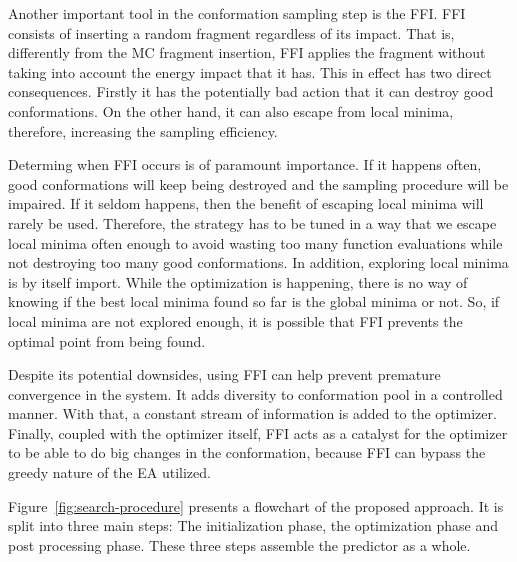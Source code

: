 Another important tool in the conformation sampling step is the \ac{FFI}.
\ac{FFI} consists of inserting a random fragment regardless of its impact. That is,
differently from the \ac{MC} fragment insertion, \ac{FFI} applies the fragment
without taking into account the energy impact that it has. This in effect has
two direct consequences. Firstly it has the potentially bad action that it can
destroy good conformations. On the other hand, it can also escape from local
minima, therefore, increasing the sampling efficiency.

Determing when \ac{FFI}
occurs is of paramount importance. If it happens often, good conformations will
keep being destroyed and the sampling procedure will be impaired. If it seldom 
happens, then the benefit of escaping local minima will rarely be used. Therefore,
the strategy has to be tuned in a way that we escape local minima often enough
to avoid wasting too many function evaluations while not destroying too many
good conformations. In addition, exploring local minima is by itself import.
While the optimization is happening, there is no way of knowing if the best local
minima found so far is the global minima or not. So, if local minima are not
explored enough, it is possible that \ac{FFI} prevents the optimal point from
being found.

Despite its potential downsides, using \ac{FFI} can help prevent premature
convergence in the system. It adds diversity to conformation pool in a controlled
manner. With that, a constant stream of information is added to the optimizer.
Finally, coupled with the optimizer itself, \ac{FFI} acts as a catalyst for the
optimizer to be able to do big changes in the conformation, because \ac{FFI} can
bypass the greedy nature of the \ac{EA} utilized.

Figure~\ref{fig:search-procedure} presents a flowchart of the proposed
approach. It is split into three main steps: The initialization phase, the
optimization phase and post processing phase. These three steps assemble the
predictor as a whole.

